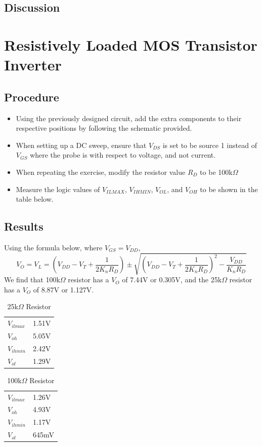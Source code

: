 \documentclass[12pt]{article}
\begin{document}
\subsection{Discussion}

\section{Resistively Loaded MOS Transistor Inverter}
\subsection{Procedure}
\begin{itemize}
\item Using the previously designed circuit, add the extra components to their respective positions by following the schematic provided.
\item When setting up a DC sweep, ensure that $V_{DS}$ is set to be source 1 instead of $V_{GS}$ where the probe is with respect to voltage, and not current.
\item When repeating the exercise, modify the resistor value $R_D$ to be 100k$\Omega$
\item Measure the logic values of $V_{IL MAX}$, $V_{IH MIN}$, $V_{OL}$, and $V_{OH}$ to be shown in the table below.
\end{itemize}
\subsection{Results}
Using the formula below, where $V_{GS}=V_{DD}$,
$$V_O=V_L=\left(V_{DD}-V_T+\frac{1}{2K_nR_D}\right)\pm\sqrt{\left(V_{DD}-V_T+\frac{1}{2K_nR_D}\right)^{2}-\frac{V_{DD}}{K_nR_D}}$$
We find that 100k$\Omega$ resistor has a $V_O$ of 7.44V or 0.305V, and the 25k$\Omega$ resistor has a $V_O$ of 8.87V or 1.127V.
\begin{table}[h]
\centering
\begin{tabular}{ll}
$V_{il max}$ & 1.51V \\
$V_{oh}$ & 5.05V \\
$V_{ih min}$ & 2.42V \\
$V_{ol}$ & 1.29V
\end{tabular}
\caption{25k$\Omega$ Resistor}
\end{table}

\begin{table}[h]
\centering
\begin{tabular}{ll}
$V_{il max}$ & 1.26V \\
$V_{oh}$ & 4.93V \\
$V_{ih min}$ & 1.17V \\
$V_{ol}$ & 645mV
\end{tabular}
\caption{100k$\Omega$ Resistor}
\end{table}
\end{document}
